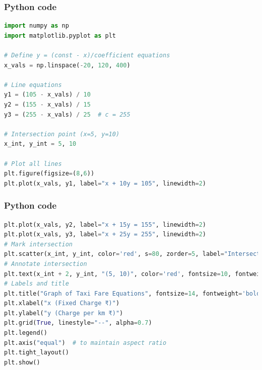 \documentclass{beamer}
\begin{document}
\begin{frame}[fragile]
    \frametitle{Python code}
    \begin{lstlisting}[language=Python]
import numpy as np
import matplotlib.pyplot as plt

# Define y = (const - x)/coefficient equations
x_vals = np.linspace(-20, 120, 400)

# Line equations
y1 = (105 - x_vals) / 10
y2 = (155 - x_vals) / 15
y3 = (255 - x_vals) / 25  # c = 255

# Intersection point (x=5, y=10)
x_int, y_int = 5, 10

# Plot all lines
plt.figure(figsize=(8,6))
plt.plot(x_vals, y1, label="x + 10y = 105", linewidth=2)


    \end{lstlisting}
\end{frame}
\begin{frame}[fragile]
    \frametitle{Python code}
    \begin{lstlisting}[language=Python]
plt.plot(x_vals, y2, label="x + 15y = 155", linewidth=2)
plt.plot(x_vals, y3, label="x + 25y = 255", linewidth=2)
# Mark intersection
plt.scatter(x_int, y_int, color='red', s=80, zorder=5, label="Intersection (5, 10)")
# Annotate intersection
plt.text(x_int + 2, y_int, "(5, 10)", color='red', fontsize=10, fontweight='bold')
# Labels and title
plt.title("Graph of Taxi Fare Equations", fontsize=14, fontweight='bold')
plt.xlabel("x (Fixed Charge ₹)")
plt.ylabel("y (Charge per km ₹)")
plt.grid(True, linestyle="--", alpha=0.7)
plt.legend()
plt.axis("equal")  # to maintain aspect ratio
plt.tight_layout()
plt.show()
     \end{lstlisting}
\end{frame}
\end{document}
